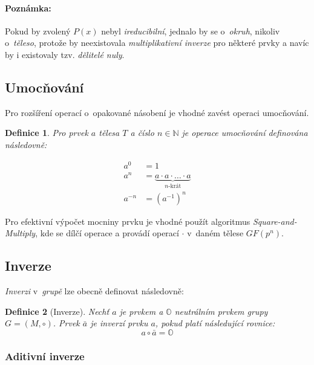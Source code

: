 \documentclass[thesis=M,czech,hidelinks]{FITthesis}[2012/06/26]
\newcommand{\0}{{\textcolor[gray]{0.80}{0}}}
\newtheorem{definice}{Definice}
\begin{document}
\paragraph{Poznámka:} Pokud by zvolený $P(x)$ nebyl \emph{ireducibilní}, jednalo
by se o~\emph{okruh}, nikoliv o~\emph{těleso}, protože by neexistovala
\emph{multiplikativní inverze} pro některé prvky a navíc by i existovaly tzv.
\emph{dělitelé nuly}.


\subsection{Umocňování}

Pro rozšíření operací o~opakované násobení je vhodné zavést operaci umocňování.

\begin{definice}
    Pro prvek $a$ tělesa $T$ a číslo $n\in\mathbb{N}$ je operace
    umocňování definována následovně:

    \begin{align*}
        a^0     &= 1 \\
        a^n     &= \underbrace{a \cdot a \cdot \ldots \cdot a}_{\text{$n$-krát}} \\
        a^{-n}  &= \left(a^{-1}\right)^n
    \end{align*}
\end{definice}

Pro efektivní výpočet mocniny prvku je vhodné použít algoritmus
\emph{Square-and-Multiply}, kde se dílčí operace  a 
provádí operací $\cdot$ v~daném tělese $GF(p^n)$.

\subsection{Inverze}

\emph{Inverzi} v~\emph{grupě} lze obecně definovat následovně:

\begin{definice}[Inverze]
    Nechť $a$ je prvkem a $\mathbb{O}$ neutrálním prvkem \emph{grupy} \\
    $G = (M,\circ)$. Prvek $\bar{a}$ je \emph{inverzí} prvku $a$, pokud
    platí následující rovnice:
    $$ a \circ \bar{a} = \mathbb{O} $$
\end{definice}

\subsubsection{Aditivní inverze}
\end{document}

